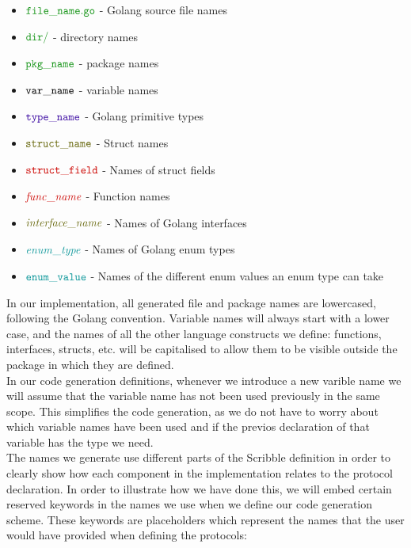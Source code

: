 \documentclass[12pt,twoside]{report}
\begin{document}
\begin{itemize}
    \item $\filename{file\_name}$ - Golang source file names
    \item $\dirname{dir}$ - directory names
    \item $\pkgname{pkg\_name}$ - package names
    \item ${\mathtt{var\_name}}$ - variable names
    \item $\typename{type\_name}$ - Golang primitive types
    \item $\structname{struct\_name}$ - Struct names
    \item $\structfield{struct\_field}$ - Names of struct fields
    \item $\functionname{func\_name}$ - Function names
    \item $\interfacename{interface\_name}$ - Names of Golang interfaces
    \item $\enumtype{enum\_type}$ - Names of Golang enum types
    \item $\enumvalue{enum\_value}$ - Names of the different enum values an enum type can take
\end{itemize}

In our implementation, all generated file and package names are lowercased, following the Golang convention. Variable names will always start with a lower case, and the names of all the other language constructs we define: functions, interfaces, structs, etc. will be capitalised to allow them to be visible outside the package in which they are defined.\\

In our code generation definitions, whenever we introduce a new varible name we will assume that the variable name has not been used previously in the same scope. This simplifies the code generation, as we do not have to worry about which variable names have been used and if the previos declaration of that variable has the type we need.\\



The names we generate use different parts of the Scribble definition in order to clearly show how each component in the implementation relates to the protocol declaration. In order to illustrate how we have done this, we will embed certain reserved keywords in the names we use when we define our code generation scheme. These keywords are placeholders which represent the names that the user would have provided when defining the protocols:
\end{document}
